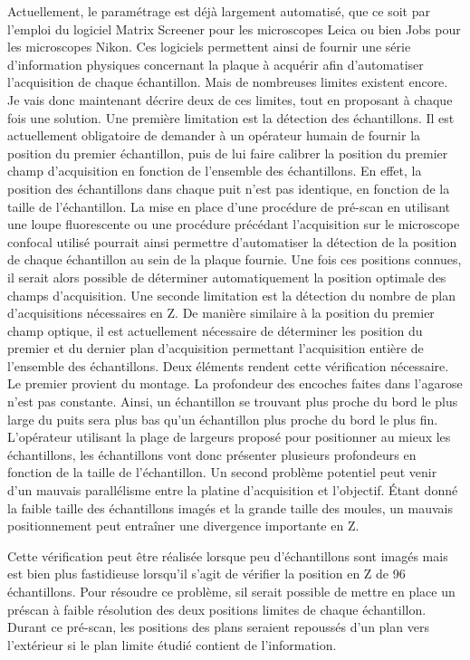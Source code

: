 \documentclass[\main/main.tex]{subfiles}
\begin{document}
Actuellement, le paramétrage est déjà largement automatisé,
que ce soit par l'emploi du logiciel Matrix Screener pour les microscopes Leica ou bien Jobs pour les microscopes Nikon.
%
Ces logiciels permettent ainsi de fournir une série d'information physiques concernant la plaque à acquérir afin d'automatiser l'acquisition de chaque échantillon.
%
Mais de nombreuses limites existent encore.
%
Je vais donc maintenant décrire deux de ces limites,
tout en proposant à chaque fois une solution.
%
Une première limitation est la détection des échantillons.
%
Il est actuellement obligatoire de demander à un opérateur humain de fournir la position du premier échantillon,
puis de lui faire calibrer la position du premier champ d'acquisition en fonction de l'ensemble des échantillons.
%
En effet, la position des échantillons dans chaque puit n'est pas identique, en fonction de la taille de l'échantillon. 
%
La mise en place d'une procédure de pré-scan en utilisant une loupe fluorescente ou une procédure précédant l'acquisition sur le microscope confocal utilisé pourrait ainsi permettre d'automatiser la détection de la position de chaque échantillon au sein de la plaque fournie.
%
Une fois ces positions connues, il serait alors possible de déterminer automatiquement la position optimale des  champs d'acquisition.
%
Une seconde limitation est la détection du nombre de plan d'acquisitions nécessaires en Z.
%
De manière similaire à la position du premier champ optique,
il est actuellement nécessaire de déterminer les position du premier et du dernier plan d'acquisition permettant l'acquisition entière de l'ensemble des échantillons.
%
Deux éléments rendent cette vérification nécessaire.
%
Le premier provient du montage.
%
La profondeur des encoches faites dans l'agarose n'est pas constante.
%
Ainsi, un échantillon se trouvant plus proche du bord le plus large du puits sera plus bas qu'un échantillon plus proche du bord le plus fin.
%
L'opérateur utilisant la plage de largeurs proposé pour positionner au mieux les échantillons,
les échantillons vont donc présenter plusieurs profondeurs en fonction de la taille de l'échantillon.
%
Un second problème potentiel peut venir d'un mauvais parallélisme entre la platine d'acquisition et l'objectif.
%
Étant donné la faible taille des échantillons imagés et la grande taille des moules, un mauvais positionnement peut entraîner une divergence importante en Z.
%

Cette vérification peut être réalisée lorsque peu d'échantillons sont imagés mais est bien plus fastidieuse lorsqu'il s'agit de vérifier la position en Z de 96 échantillons.
%
Pour résoudre ce problème, sil serait possible de mettre en place un préscan à faible résolution des deux positions limites de chaque échantillon.
%
Durant ce pré-scan, les positions des plans seraient repoussés d'un plan vers l'extérieur si le plan limite étudié contient de l'information.
\end{document}

